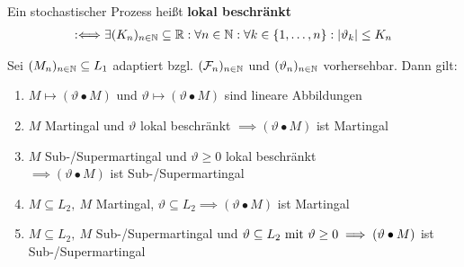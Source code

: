 \begin{defi} %
	Ein stochastischer Prozess heißt \textbf{lokal beschränkt}
	\begin{align*}
		:\Longleftrightarrow\exists(K_n)_{n\in\N}\subseteq\R:\forall n\in\N:\forall k\in\lbrace1,\ldots,n\rbrace:|\vartheta_k|\leq K_n
	\end{align*}
\end{defi}

\begin{theorem}\label{theorem2.5}
	Sei $(M_n)_{n\in\N}\subseteq L_1$ adaptiert bzgl. $(\F_n)_{n\in\N}$ und $(\vartheta_n)_{n\in\N}$ vorhersehbar. Dann gilt:

	\begin{enumerate}[label=(\alph*)]
		\item $M\mapsto(\vartheta\bullet M)$ und $\vartheta\mapsto(\vartheta\bullet M)$ sind lineare Abbildungen
		\item $M$ Martingal und $\vartheta$ lokal beschränkt $\implies(\vartheta\bullet M)$ ist Martingal
		\item $M$ Sub-/Supermartingal und $\vartheta\geq0$ lokal beschränkt\\ $\implies(\vartheta\bullet M)$ ist Sub-/Supermartingal
		\item $M\subseteq L_2,~M$ Martingal, $\vartheta\subseteq L_2\implies(\vartheta\bullet M)$ ist Martingal
		\item $M\subseteq L_2,~M$ Sub-/Supermartingal und $\vartheta\subseteq L_2\mit\vartheta\geq0\\\implies(\vartheta\bullet M)$ ist Sub-/Supermartingal
	\end{enumerate}
\end{theorem}

